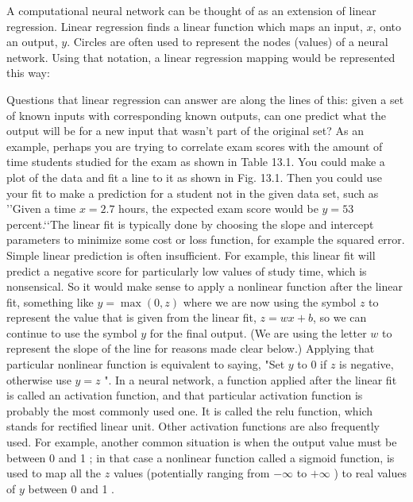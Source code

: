 A computational neural network can be thought of as an extension of linear regression. Linear regression finds a linear function which maps an input, $x$, onto an output, $y$. Circles are often used to represent the nodes (values) of a neural network. Using that notation, a linear regression mapping would be represented this way:

Questions that linear regression can answer are along the lines of this: given a set of known inputs with corresponding known outputs, can one predict what the output will be for a new input that wasn't part of the original set? As an example, perhaps you are trying to correlate exam scores with the amount of time students studied for the exam as shown in Table 13.1.
You could make a plot of the data and fit a line to it as shown in Fig. 13.1. Then you could use your fit to make a prediction for a student not in the given data set, such as \rq\rq Given a time $x=2.7$ hours, the expected exam score would be $y=53$ percent.\lq\lq The linear fit is typically done by choosing the slope and intercept parameters to minimize some cost or loss function, for example the squared error.\\

Simple linear prediction is often insufficient. For example, this linear fit will predict a negative score for particularly low values of study time, which is nonsensical. So it would make sense to apply a nonlinear function after the linear fit, something like $y=\max (0, z)$ where we are now using the symbol $z$ to represent the value that is given from the linear fit, $z=w x+b$, so we can continue to use the symbol $y$ for the final output. (We are using the letter $w$ to represent the slope of the line for reasons made clear below.) Applying that particular nonlinear function is equivalent to saying, "Set $y$ to 0 if $z$ is negative, otherwise use $y=z$ ".
In a neural network, a function applied after the linear fit is called an activation function, and that particular activation function is probably the most commonly used one. It is called the relu function, which stands for rectified linear unit. Other activation functions are also frequently used. For example, another common situation is when the output value must be between 0 and 1 ; in that case a nonlinear function called a sigmoid function, is used to map all the $z$ values (potentially ranging from $-\infty$ to $+\infty$ ) to real values of $y$ between 0 and 1 .
